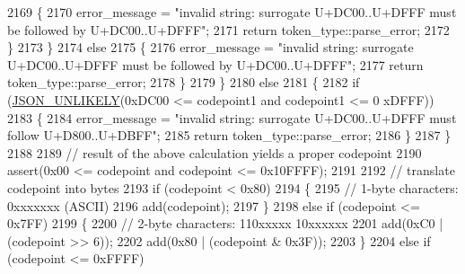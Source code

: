 \begin{DoxyCode}
2169                                     \{
2170                                         error\_message = \textcolor{stringliteral}{"invalid string: surrogate U+DC00..U+DFFF must be
       followed by U+DC00..U+DFFF"};
2171                                         \textcolor{keywordflow}{return} token\_type::parse\_error;
2172                                     \}
2173                                 \}
2174                                 \textcolor{keywordflow}{else}
2175                                 \{
2176                                     error\_message = \textcolor{stringliteral}{"invalid string: surrogate U+DC00..U+DFFF must be
       followed by U+DC00..U+DFFF"};
2177                                     \textcolor{keywordflow}{return} token\_type::parse\_error;
2178                                 \}
2179                             \}
2180                             \textcolor{keywordflow}{else}
2181                             \{
2182                                 \textcolor{keywordflow}{if} (\hyperlink{json_8hpp_ab77582407c64944e7db1ea95ab520253}{JSON\_UNLIKELY}(0xDC00 <= codepoint1 and codepoint1 <= 0
      xDFFF))
2183                                 \{
2184                                     error\_message = \textcolor{stringliteral}{"invalid string: surrogate U+DC00..U+DFFF must follow
       U+D800..U+DBFF"};
2185                                     \textcolor{keywordflow}{return} token\_type::parse\_error;
2186                                 \}
2187                             \}
2188 
2189                             \textcolor{comment}{// result of the above calculation yields a proper codepoint}
2190                             assert(0x00 <= codepoint and codepoint <= 0x10FFFF);
2191 
2192                             \textcolor{comment}{// translate codepoint into bytes}
2193                             \textcolor{keywordflow}{if} (codepoint < 0x80)
2194                             \{
2195                                 \textcolor{comment}{// 1-byte characters: 0xxxxxxx (ASCII)}
2196                                 add(codepoint);
2197                             \}
2198                             \textcolor{keywordflow}{else} \textcolor{keywordflow}{if} (codepoint <= 0x7FF)
2199                             \{
2200                                 \textcolor{comment}{// 2-byte characters: 110xxxxx 10xxxxxx}
2201                                 add(0xC0 | (codepoint >> 6));
2202                                 add(0x80 | (codepoint & 0x3F));
2203                             \}
2204                             \textcolor{keywordflow}{else} \textcolor{keywordflow}{if} (codepoint <= 0xFFFF)

\end{DoxyCode}
